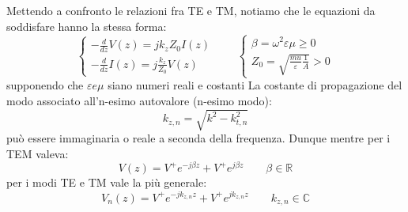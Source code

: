 \documentclass{book}
\begin{document}
    Mettendo a confronto le relazioni fra TE e TM, notiamo che le equazioni da soddisfare hanno la stessa forma:
    \begin{equation}
        \begin{cases}
            \displaystyle -\frac{d}{dz}V(z) = j k_{z}Z_{0}I(z) \\
            \displaystyle -\frac{d}{dz}I(z)=j \frac{k_{z}}{Z_{0}}V(z)
        \end{cases}
        \qquad
        \begin{cases}
            \beta = \omega ^{2} \varepsilon \mu \geq 0 \\
            \displaystyle Z_{0} = \sqrt{\frac{mu}{\varepsilon}\frac{1}{A}} > 0    
        \end{cases}
    \end{equation} 
    supponendo che $\varepsilon e \mu$ siano numeri reali e costanti
    La costante di propagazione del modo associato all'n-esimo autovalore (n-esimo modo):
    \begin{equation}
        k_{z,n} = \sqrt{k^{2}-k_{t,n} ^{2}}
    \end{equation}
    può essere immaginaria o reale a seconda della frequenza. Dunque mentre per i TEM valeva:
    \begin{equation}
        V(z) = V^{+}e^{-j \beta z} +V^{+}e^{j \beta z} \qquad \beta \in \mathbb{R}
    \end{equation}
    per i modi TE e TM vale la più generale:
    \begin{equation}
        V_{n}(z) = V^{+}e^{-j k_{z, n} z} +V^{+}e^{j k_{z, n} z} \qquad k_{z, n} \in \mathbb{C}
    \end{equation}
\end{document}
